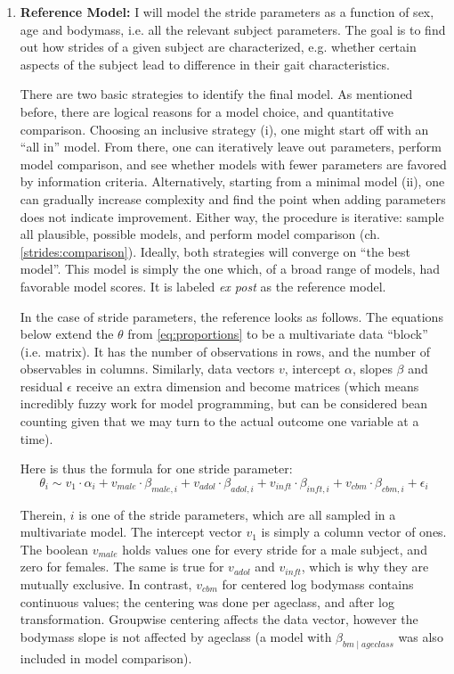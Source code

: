 \begin{enumerate}
\item \textbf{Reference Model:}
\label{sec:orge7f3220}
I will model the stride parameters as a function of sex, age and bodymass, i.e. all the relevant subject parameters.
The goal is to find out how strides of a given subject are characterized, e.g. whether certain aspects of the subject lead to difference in their gait characteristics.

There are two basic strategies to identify the final model.
As mentioned before, there are logical reasons for a model choice, and quantitative comparison.
Choosing an inclusive strategy (i), one might start off with an ``all in'' model.
From there, one can iteratively leave out parameters, perform model comparison, and see whether models with fewer parameters are favored by information criteria.
Alternatively, starting from a minimal model (ii), one can gradually increase complexity and find the point when adding parameters does not indicate improvement.
Either way, the procedure is iterative: sample all plausible, possible models, and perform model comparison (ch. \ref{strides:comparison}).
Ideally, both strategies will converge on ``the best model''.
This model is simply the one which, of a broad range of models, had favorable model scores.
It is labeled \emph{ex post} as the reference model.


In the case of stride parameters, the reference looks as follows.
The equations below extend the \(\theta\) from \eqref{eq:proportions} to be a multivariate data ``block'' (i.e. matrix).
It has the number of observations in rows, and the number of observables in columns.
Similarly, data vectors \(v\), intercept \(\alpha\), slopes \(\beta\) and residual \(\epsilon\) receive an extra dimension and become matrices (which means incredibly fuzzy work for model programming, but can be considered bean counting given that we may turn to the actual outcome one variable at a time).

Here is thus the formula for one stride parameter:
\begin{equation} \theta_{i} \sim v_{1}\cdot\alpha_{i} + v_{male}\cdot\beta_{male,i} + v_{adol}\cdot\beta_{adol,i} + v_{inft}\cdot\beta_{inft,i} + v_{cbm}\cdot\beta_{cbm,i} + \epsilon_{i} \label{eq:stride} \end{equation}

Therein, \(i\) is one of the stride parameters, which are all sampled in a multivariate model.
The intercept vector \(v_{1}\) is simply a column vector of ones.
The boolean \(v_{male}\) holds values one for every stride for a male subject, and zero for females.
The same is true for \(v_{adol}\) and \(v_{inft}\), which is why they are mutually exclusive.
In contrast, \(v_{cbm}\) for centered log bodymass contains continuous values; the centering was done per ageclass, and after log transformation.
Groupwise centering affects the data vector, however the bodymass slope is not affected by ageclass (a model with \(\beta_{bm\mid ageclass}\) was also included in model comparison).



\end{enumerate}
